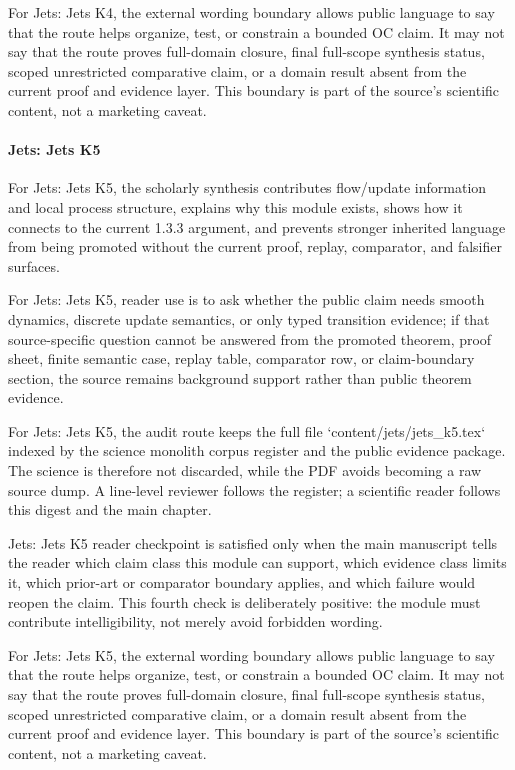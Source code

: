 For Jets: Jets K4, the external wording boundary allows public language to say that the route helps organize, test, or constrain a bounded OC claim. It may not say that the route proves full-domain closure, final full-scope synthesis status, scoped unrestricted comparative claim, or a domain result absent from the current proof and evidence layer. This boundary is part of the source's scientific content, not a marketing caveat.


\paragraph{Jets: Jets K5}

For Jets: Jets K5, the scholarly synthesis contributes flow/update information and local process structure, explains why this module exists, shows how it connects to the current 1.3.3 argument, and prevents stronger inherited language from being promoted without the current proof, replay, comparator, and falsifier surfaces.


For Jets: Jets K5, reader use is to ask whether the public claim needs smooth dynamics, discrete update semantics, or only typed transition evidence; if that source-specific question cannot be answered from the promoted theorem, proof sheet, finite semantic case, replay table, comparator row, or claim-boundary section, the source remains background support rather than public theorem evidence.


For Jets: Jets K5, the audit route keeps the full file `content/jets/jets\_k5.tex` indexed by the science monolith corpus register and the public evidence package. The science is therefore not discarded, while the PDF avoids becoming a raw source dump. A line-level reviewer follows the register; a scientific reader follows this digest and the main chapter.


Jets: Jets K5 reader checkpoint is satisfied only when the main manuscript tells the reader which claim class this module can support, which evidence class limits it, which prior-art or comparator boundary applies, and which failure would reopen the claim. This fourth check is deliberately positive: the module must contribute intelligibility, not merely avoid forbidden wording.


For Jets: Jets K5, the external wording boundary allows public language to say that the route helps organize, test, or constrain a bounded OC claim. It may not say that the route proves full-domain closure, final full-scope synthesis status, scoped unrestricted comparative claim, or a domain result absent from the current proof and evidence layer. This boundary is part of the source's scientific content, not a marketing caveat.


